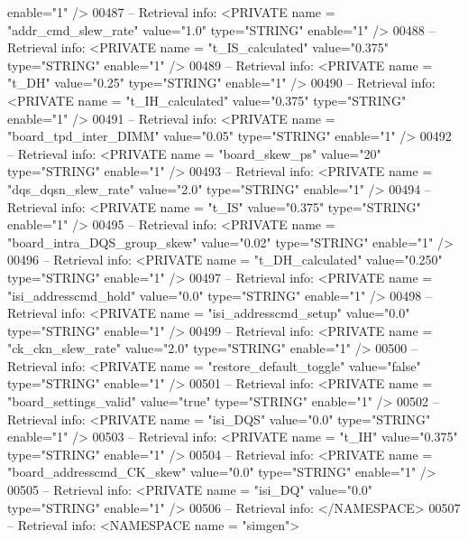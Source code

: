 \begin{DoxyCode}
{{       enable="1" />}
00487 \textcolor{keyword}{-- Retrieval info:      <PRIVATE name = "addr\_cmd\_slew\_rate" value="1.0"  type="STRING"  enable="1" />}
00488 \textcolor{keyword}{-- Retrieval info:      <PRIVATE name = "t\_IS\_calculated" value="0.375"  type="STRING"  enable="1" />}
00489 \textcolor{keyword}{-- Retrieval info:      <PRIVATE name = "t\_DH" value="0.25"  type="STRING"  enable="1" />}
00490 \textcolor{keyword}{-- Retrieval info:      <PRIVATE name = "t\_IH\_calculated" value="0.375"  type="STRING"  enable="1" />}
00491 \textcolor{keyword}{-- Retrieval info:      <PRIVATE name = "board\_tpd\_inter\_DIMM" value="0.05"  type="STRING"  enable="1" />}
00492 \textcolor{keyword}{-- Retrieval info:      <PRIVATE name = "board\_skew\_ps" value="20"  type="STRING"  enable="1" />}
00493 \textcolor{keyword}{-- Retrieval info:      <PRIVATE name = "dqs\_dqsn\_slew\_rate" value="2.0"  type="STRING"  enable="1" />}
00494 \textcolor{keyword}{-- Retrieval info:      <PRIVATE name = "t\_IS" value="0.375"  type="STRING"  enable="1" />}
00495 \textcolor{keyword}{-- Retrieval info:      <PRIVATE name = "board\_intra\_DQS\_group\_skew" value="0.02"  type="STRING" 
       enable="1" />}
00496 \textcolor{keyword}{-- Retrieval info:      <PRIVATE name = "t\_DH\_calculated" value="0.250"  type="STRING"  enable="1" />}
00497 \textcolor{keyword}{-- Retrieval info:      <PRIVATE name = "isi\_addresscmd\_hold" value="0.0"  type="STRING"  enable="1" />}
00498 \textcolor{keyword}{-- Retrieval info:      <PRIVATE name = "isi\_addresscmd\_setup" value="0.0"  type="STRING"  enable="1" />}
00499 \textcolor{keyword}{-- Retrieval info:      <PRIVATE name = "ck\_ckn\_slew\_rate" value="2.0"  type="STRING"  enable="1" />}
00500 \textcolor{keyword}{-- Retrieval info:      <PRIVATE name = "restore\_default\_toggle" value="false"  type="STRING"  enable="1"
       />}
00501 \textcolor{keyword}{-- Retrieval info:      <PRIVATE name = "board\_settings\_valid" value="true"  type="STRING"  enable="1" />}
00502 \textcolor{keyword}{-- Retrieval info:      <PRIVATE name = "isi\_DQS" value="0.0"  type="STRING"  enable="1" />}
00503 \textcolor{keyword}{-- Retrieval info:      <PRIVATE name = "t\_IH" value="0.375"  type="STRING"  enable="1" />}
00504 \textcolor{keyword}{-- Retrieval info:      <PRIVATE name = "board\_addresscmd\_CK\_skew" value="0.0"  type="STRING"  enable="1"
       />}
00505 \textcolor{keyword}{-- Retrieval info:      <PRIVATE name = "isi\_DQ" value="0.0"  type="STRING"  enable="1" />}
00506 \textcolor{keyword}{-- Retrieval info:     </NAMESPACE>}
00507 \textcolor{keyword}{-- Retrieval info:     <NAMESPACE name = "simgen">}
}
\end{DoxyCode}
